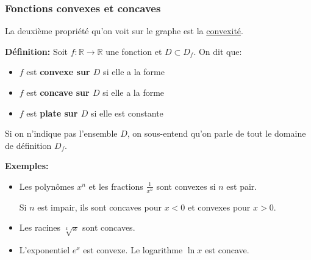 \documentclass[8pt]{article} %
\newcommand{\bitem}{\item[$\bullet$]}
\newcommand{\R}{\mathbb R}
\begin{document}
\begin{frame}[plain]
\frametitle{\bf Fonctions convexes et concaves}
\medskip 

{\small 
La deuxi\`eme propri\'et\'e qu'on voit sur le graphe est la 
\underline{convexit\'e}.}
\vspace*{2mm}

{\bf D\'efinition:} 
Soit $f:\R\rightarrow\R$ une fonction et $D\subset D_f$. On dit que: 
\vspace*{1mm}

\begin{itemize}
\bitem
\parbox[t]{6cm}{
$f$ est {\bf convexe sur $D$} si elle a la forme 
}
\quad
\raisebox{-.5\height}{\convexe}  
\vspace*{1mm}

\bitem
\parbox[t]{6cm}{
$f$ est {\bf concave sur $D$} si elle a la forme
}
\quad
\raisebox{-.5\height}{\concave} 
\vspace*{1mm}

\bitem
\parbox[t]{6cm}{
$f$ est {\bf plate sur $D$} si elle est constante
}
\quad
\raisebox{-.5\height}{\constant}  
\end{itemize} 
\vspace*{1mm}

\pause
{\small
Si on n'indique pas l'ensemble $D$, on sous-entend qu'on parle de tout le 
domaine de d\'efinition $D_f$.
} 
\vspace*{2mm}

\pause
{\small 
{\bf Exemples:}
\begin{itemize}
\bitem
Les polyn\^omes $x^n$ et les fractions $\frac{1}{x^n}$ sont convexes si $n$ 
est pair. 
\vspace*{1mm}

Si $n$ est impair, ils sont concaves pour $x<0$ et convexes pour $x>0$.  
\vspace*{1mm}

\bitem
Les racines $\sqrt[k]{x}$ sont concaves. 
\vspace*{1mm}

\bitem
L'exponentiel $e^x$ est convexe. Le logarithme $\ln x$ est concave. 
\end{itemize} 
}

\end{frame}


\raisebox{-.8\height}{\pair}
\raisebox{-.8\height}{\impair} 
\raisebox{-.8\height}{\periodique} 
\end{document}

